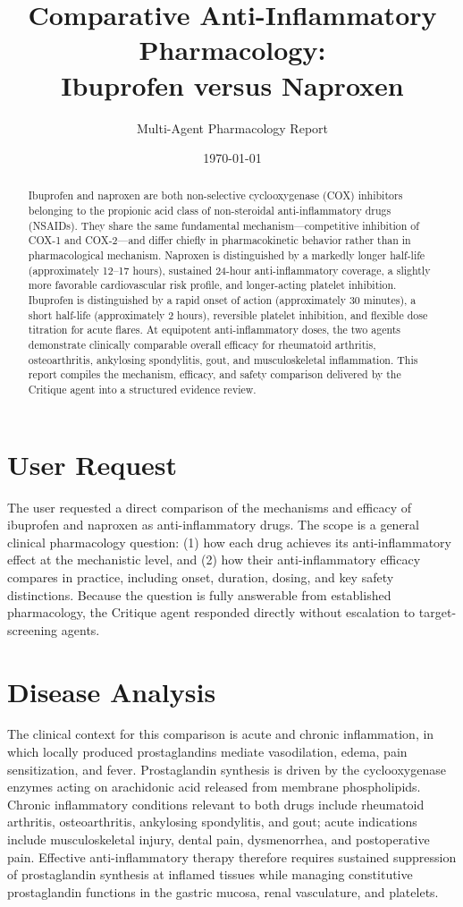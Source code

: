 \documentclass[11pt]{article}
\title{\textbf{Comparative Anti-Inflammatory Pharmacology:\\ Ibuprofen versus Naproxen}}
\author{Multi-Agent Pharmacology Report}
\date{\today}
\begin{document}
\maketitle

\begin{abstract}
\noindent
Ibuprofen and naproxen are both non-selective cyclooxygenase (COX) inhibitors belonging to the propionic acid class of non-steroidal anti-inflammatory drugs (NSAIDs). They share the same fundamental mechanism---competitive inhibition of COX-1 and COX-2---and differ chiefly in pharmacokinetic behavior rather than in pharmacological mechanism. Naproxen is distinguished by a markedly longer half-life (approximately 12--17 hours), sustained 24-hour anti-inflammatory coverage, a slightly more favorable cardiovascular risk profile, and longer-acting platelet inhibition. Ibuprofen is distinguished by a rapid onset of action (approximately 30 minutes), a short half-life (approximately 2 hours), reversible platelet inhibition, and flexible dose titration for acute flares. At equipotent anti-inflammatory doses, the two agents demonstrate clinically comparable overall efficacy for rheumatoid arthritis, osteoarthritis, ankylosing spondylitis, gout, and musculoskeletal inflammation. This report compiles the mechanism, efficacy, and safety comparison delivered by the Critique agent into a structured evidence review.
\end{abstract}

\section{User Request}
The user requested a direct comparison of the mechanisms and efficacy of ibuprofen and naproxen as anti-inflammatory drugs. The scope is a general clinical pharmacology question: (1) how each drug achieves its anti-inflammatory effect at the mechanistic level, and (2) how their anti-inflammatory efficacy compares in practice, including onset, duration, dosing, and key safety distinctions. Because the question is fully answerable from established pharmacology, the Critique agent responded directly without escalation to target-screening agents.

\section{Disease Analysis}
The clinical context for this comparison is acute and chronic inflammation, in which locally produced prostaglandins mediate vasodilation, edema, pain sensitization, and fever. Prostaglandin synthesis is driven by the cyclooxygenase enzymes acting on arachidonic acid released from membrane phospholipids. Chronic inflammatory conditions relevant to both drugs include rheumatoid arthritis, osteoarthritis, ankylosing spondylitis, and gout; acute indications include musculoskeletal injury, dental pain, dysmenorrhea, and postoperative pain. Effective anti-inflammatory therapy therefore requires sustained suppression of prostaglandin synthesis at inflamed tissues while managing constitutive prostaglandin functions in the gastric mucosa, renal vasculature, and platelets.
\end{document}
